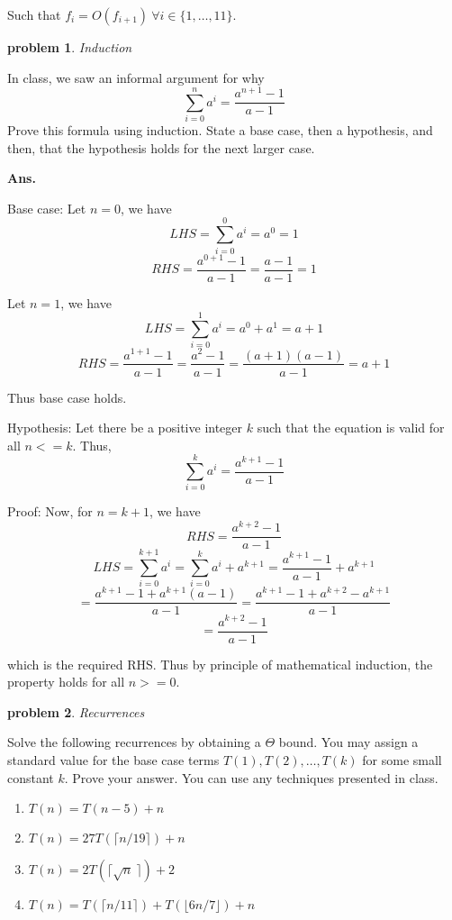 \documentclass[11pt]{article}
\newtheorem{problem}{\sc\color{cit}problem}
\begin{document}
   Such that $f_i = O(f_{i+1})~\forall i\in\{1, \ldots, 11\}$.
   
\newpage   

\begin{problem}Induction\end{problem}
In class, we saw an informal argument for why
$$ \sum_{i=0}^n a^ i = \frac{a^{n+1}-1}{a-1} $$
Prove this formula using induction. State a base case, then a hypothesis,
and then, that the hypothesis holds for the next larger case.

\hfill
   
\noindent \textbf{Ans.}

Base case: Let $n=0$, we have 
$$LHS = \sum_{i=0}^0 a^ i = a^0 = 1$$
$$RHS = \frac{a^{0+1}-1}{a-1} = \frac{a-1}{a-1} = 1 $$

Let $n=1$, we have 
$$LHS = \sum_{i=0}^1 a^ i = a^0 +a^1 = a+1$$
$$RHS = \frac{a^{1+1}-1}{a-1} = \frac{a^2-1}{a-1} = \frac{(a+1)(a-1)}{a-1} = a+1 $$

Thus base case holds. 

Hypothesis: Let there be a positive integer $k$ such that the equation is valid for all $n<=k$. Thus,
$$ \sum_{i=0}^k a^ i = \frac{a^{k+1}-1}{a-1} $$

Proof: Now, for $n=k+1$, we have
$$RHS =\frac{a^{k+2}-1}{a-1}$$
$$LHS = \sum_{i=0}^{k+1} a^ i = \sum_{i=0}^k a^ i + a^{k+1} = \frac{a^{k+1}-1}{a-1} + a^{k+1}$$
$$=\frac{a^{k+1}-1+a^{k+1}(a-1)}{a-1} = \frac{a^{k+1}-1+a^{k+2}-a^{k+1}}{a-1}$$
$$=\frac{a^{k+2}-1}{a-1}$$

which is the required RHS. Thus by principle of mathematical induction, the property holds for all $n>=0.$
\newpage   

\begin{problem} Recurrences \end{problem}
Solve the following recurrences by obtaining a $\Theta$ bound.  You may assign a standard value for the base case terms $T(1),T(2),\ldots,T(k)$ for some small constant $k$. Prove your answer. You can use any techniques presented in class.
\begin{enumerate}
\item $T(n) = T(n-5) + n$
\item $T(n) = 27T(\lceil n/19 \rceil) + n$
\item $T(n) = 2T(\lceil \sqrt{n}\ \rceil ) + 2$
\item $T(n)= T(\lceil n/11 \rceil ) +  T(\lfloor 6n/7 \rfloor) + n$
\end{enumerate}
   
\end{document}
